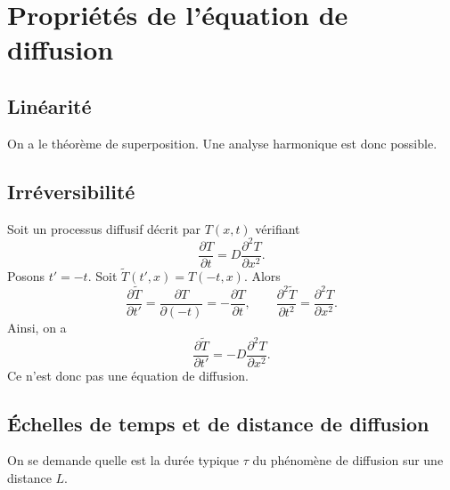 \section{Propriétés de l'équation de diffusion}
    \subsection{Linéarité}

        On a le théorème de superposition. Une analyse harmonique est donc possible.

    \subsection{Irréversibilité}
        Soit un processus diffusif décrit par $T(x,t)$ vérifiant
        \begin{equation*}
            \frac{\partial T}{\partial t}=D\frac{\partial^{2}T}{\partial x^{2}}.
        \end{equation*}
        Posons $t'=-t$. Soit $\widetilde{T}(t',x)=T(-t,x)$. Alors
        \begin{equation*}
            \frac{\partial\widetilde{T}}{\partial t'}=\frac{\partial T}{\partial(-t)}=-\frac{\partial T}{\partial t},\qquad\frac{\partial^{2}\widetilde{T}  }{\partial t^{2}}=\frac{\partial^{2}T}{\partial x^{2}}.
        \end{equation*}
        Ainsi, on a 
        \begin{equation*}
            \frac{\partial\widetilde{T}}{\partial t'}=-D\frac{\partial^{2}T}{\partial x^{2}}.
        \end{equation*}
        Ce n'est donc pas une équation de diffusion.

    \subsection{Échelles de temps et de distance de diffusion}
        
        On se demande quelle est la durée typique $\tau$ du phénomène de diffusion sur une distance $L$.

